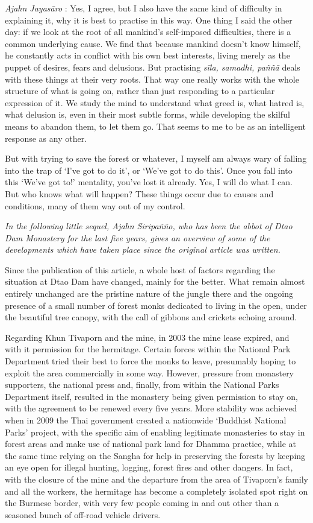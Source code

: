 \emph{Ajahn Jayasāro }: Yes, I agree, but I also have the same kind of
difficulty in explaining it, why it is best to practise in this way. One
thing I said the other day: if we look at the root of all mankind's
self-imposed difficulties, there is a common underlying cause. We find
that because mankind doesn't know himself, he constantly acts in
conflict with his own best interests, living merely as the puppet of
desires, fears and delusions. But practising \emph{sīla, samadhi, paññā}
deals with these things at their very roots. That way one really works
with the whole structure of what is going on, rather than just
responding to a particular expression of it. We study the mind to
understand what greed is, what hatred is, what delusion is, even in
their most subtle forms, while developing the skilful means to abandon
them, to let them go. That seems to me to be as an intelligent response
as any other.

But with trying to save the forest or whatever, I myself am always wary
of falling into the trap of `I've got to do it', or `We've got to do
this'. Once you fall into this `We've got to!' mentality, you've lost it
already. Yes, I will do what I can. But who knows what will happen?
These things occur due to causes and conditions, many of them way out of
my control.



\emph{In the following little sequel, Ajahn Siripañño, who has been the
abbot of Dtao Dam Monastery for the last five years, gives an overview
of some of the developments which have taken place since the original
article was written.}

Since the publication of this article, a whole host of factors regarding
the situation at Dtao Dam have changed, mainly for the better. What
remain almost entirely unchanged are the pristine nature of the jungle
there and the ongoing presence of a small number of forest monks
dedicated to living in the open, under the beautiful tree canopy, with
the call of gibbons and crickets echoing around.

Regarding Khun Tivaporn and the mine, in 2003 the mine lease expired,
and with it permission for the hermitage. Certain forces within the
National Park Department tried their best to force the monks to leave,
presumably hoping to exploit the area commercially in some way. However,
pressure from monastery supporters, the national press and, finally,
from within the National Parks Department itself, resulted in the
monastery being given permission to stay on, with the agreement to be
renewed every five years. More stability was achieved when in 2009 the
Thai government created a nationwide `Buddhist National Parks' project,
with the specific aim of enabling legitimate monasteries to stay in
forest areas and make use of national park land for Dhamma practice,
while at the same time relying on the Sangha for help in preserving the
forests by keeping an eye open for illegal hunting, logging, forest
fires and other dangers. In fact, with the closure of the mine and the
departure from the area of Tivaporn's family and all the workers, the
hermitage has become a completely isolated spot right on the Burmese
border, with very few people coming in and out other than a seasoned
bunch of off-road vehicle drivers.

